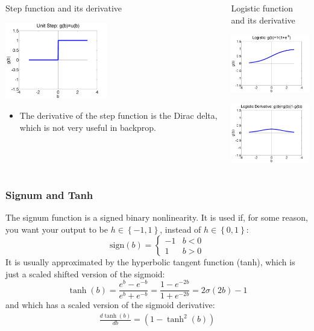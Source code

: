 \documentclass{beamer}
\begin{document}
\begin{frame}
  \begin{columns}[t]
    \column{2.25in}
    \begin{block}{Step function and its derivative}
      \centerline{\includegraphics[width=1.75in]{../lec07/figs/nn_unitstep.png}}
      \begin{itemize}
      \item The derivative of the step function is the Dirac
        delta, which is not very useful in backprop.
      \end{itemize}
    \end{block}
    \column{2.25in}
    \begin{block}{Logistic function and its derivative}
      \centerline{\includegraphics[width=1.75in]{../lec07/figs/nn_logistic.png}}
      \centerline{\includegraphics[width=1.75in]{../lec07/figs/nn_logisticprime.png}}
    \end{block}
  \end{columns}
\end{frame}

\begin{frame}
  \frametitle{Signum and Tanh}

  The signum function is a signed binary nonlinearity.  It is used if,
  for some reason, you want your output to be
  $h\in\left\{-1,1\right\}$, instead of $h\in\left\{0,1\right\}$:
  \[
  \mbox{sign}(b)=\begin{cases}
  -1 & b<0\\
  1 & b>0
  \end{cases}
  \]
  It is usually approximated by the hyperbolic tangent function
  (tanh), which is just a scaled shifted version of the sigmoid:
  \begin{displaymath}
    \tanh(b) = \frac{e^b-e^{-b}}{e^b+e^{-b}}
    = \frac{1-e^{-2b}}{1+e^{-2b}}
    = 2\sigma(2b)-1
  \end{displaymath}
  and which has a scaled version of the sigmoid derivative:
  \begin{align*}
    \frac{d\tanh(b)}{db} =\left(1-\tanh^2(b)\right)
  \end{align*}
\end{frame}
\end{document}
